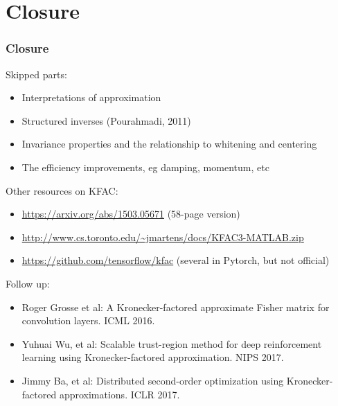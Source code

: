 \section{Closure}

\begin{frame}
\frametitle{Closure}
{\footnotesize

Skipped parts:
\begin{itemize}
\item Interpretations of approximation
\item Structured inverses (Pourahmadi, 2011)
\item Invariance properties and the relationship to whitening and centering
\item The efficiency improvements, eg damping, momentum, etc
\end{itemize}

Other resources on KFAC:
\begin{itemize}
\item \url{https://arxiv.org/abs/1503.05671} (58-page version)
\item \url{http://www.cs.toronto.edu/~jmartens/docs/KFAC3-MATLAB.zip}
\item \url{https://github.com/tensorflow/kfac} (several in Pytorch, but not official)
\end{itemize}

Follow up:
\begin{itemize}
\item Roger Grosse et al: A Kronecker-factored approximate Fisher matrix for convolution layers. ICML 2016.
\item Yuhuai Wu, et al: Scalable trust-region method for deep reinforcement learning using Kronecker-factored approximation. NIPS 2017.
\item Jimmy Ba, et al: Distributed second-order optimization using Kronecker-factored approximations. ICLR 2017.
\end{itemize}

}
\end{frame}

